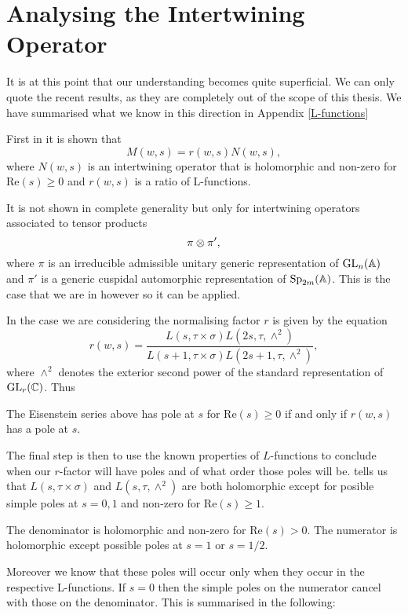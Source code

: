     \section{Analysing the Intertwining Operator}
    It is at this point that our understanding becomes quite superficial. We can only quote the recent results, as they are completely out of the scope of this thesis. We have summarised what we know in this direction in Appendix \ref{L-functions}
    
    First in \cite[11.1]{cogdellFUNCTORIALITYCLASSICALGROUPS} it is shown that 
    \[M(w, s) = r(w, s)N(w,s),\]
    where \(N(w,s)\) is an intertwining operator that is holomorphic and non-zero for \(\mathrm{Re}(s)\geq 0\) and \(r(w, s)\) is a ratio of L-functions.
    \begin{remark}
    	It is not shown in complete generality but only for intertwining operators associated to tensor products
    	\[\pi\otimes \pi',\]
    	where \(\pi\) is an irreducible admissible unitary generic representation of \(\GL_n(\A)\) and \(\pi'\) is a generic cuspidal automorphic representation of \(\Sp_{2m}(\A)\). This is the case that we are in however so it can be applied. 
    \end{remark}
    
     In the case we are considering the normalising factor \(r\) is given by the equation \cite[4A]{jiangPolesCertainResidual2013}
     \[r(w, s) = \frac{L(s, \tau\times \sigma)L(2s, \tau,\wedge^2)}{L(s+1, \tau\times \sigma)L(2s+1, \tau, \wedge^2)},\]
    where \(\wedge^2\) denotes the exterior second power of the standard representation of \(\GL_r(\C)\). Thus

     \begin{Lemma}
        The Eisenstein series above has pole at \(s\) for \(\mathrm{Re}(s)\geq 0\) if and only if \(r(w,s)\) has a pole at \(s\).
     \end{Lemma}
     The final step is then to use the known properties of \(L\)-functions to conclude when our \(r\)-factor will have poles and of what order those poles will be. \cite{jiangPolesCertainResidual2013} tells us that \(L(s, \tau\times \sigma)\) and \(L(s, \tau, \wedge^2)\) are both holomorphic except for posible simple poles at \(s=0, 1\) and non-zero for \(\mathrm{Re}(s)\geq 1\). 
     
     The denominator is holomorphic and non-zero for \(\mathrm{Re}(s)>0\).
	 The numerator is holomorphic except possible poles at \(s= 1\) or \(s=1/2\). 
	 
	 Moreover we know that these poles will occur only when they occur in the respective L-functions. If \(s=0\) then the simple poles on the numerator cancel with those on the denominator. This is summarised in the following:

